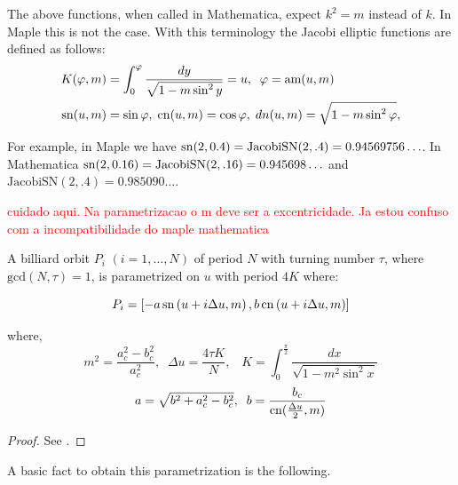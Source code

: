 \begin{remark} The above functions, when called in Mathematica, expect $ k^2 =m$  instead of $k$. In Maple this is not the case.
With this terminology the  Jacobi elliptic functions are defined    as follows:
\begin{align*}
K(\varphi,m)&=\int_0^{\varphi} \frac{dy}{\sqrt{1-m\sin^2y}}=u,\;\; \varphi=\text{am}(u,m)\\
\mathrm{sn}(u,m)&=\sin\varphi,\; \mathrm{cn}(u,m)=\cos\varphi,\; dn(u,m)=\sqrt{1-m\sin^2\varphi}, \end{align*}


For example, in Maple we have $\mathrm{sn}(2,0.4)=\text{JacobiSN}(2,.4)=0.94569756\ldots$. In    Mathematica   $\mathrm{sn}(2,0.16)=\text{JacobiSN}(2,.16)=0.945698 \ldots$  and $\text{JacobiSN}(2,.4)=0.985090\ldots$.
\end{remark}


 \textcolor{red}{cuidado aqui. Na parametrizacao o m deve ser a excentricidade. Ja estou confuso com a incompatibilidade do maple mathematica}
 
\begin{theorem}
A billiard orbit $P_i$ $(i=1,\ldots, N) $ of period $N$  with turning number $\tau$, where $\mathrm{gcd}(N,\tau) =1$,  is parametrized on $u$ with period $4K$ where:


\[ 
P_i=
\left[-a\,\mathrm{sn}  \left(u+ i \Delta{u},  {m} \right) , b\,\mathrm{cn}  \left(u + i \Delta{u}, { m} \right)\right]
\]

where,
\[ m^2=\frac{a_c^2-b_c^2}{a_c^2},\;\;\Delta{u}=\frac{4\tau K}{N},\;\;\;K=\int_{0}^{\frac{\pi}{2}} \frac {dx}{\sqrt {1-m^2\sin^2 x}} \]
\[a= \sqrt{b^2+ a_c^2-b_c^2}, \;\; b=\frac{b_c}{\mathrm{cn}(\frac{\Delta{u}}{2}, m)}\]
\end{theorem}
\begin{proof} See \cite{stachel2021-billiards}.\end{proof}

A basic fact to obtain this parametrization is the following.


